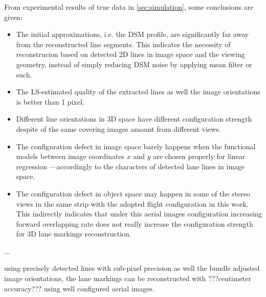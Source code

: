 From experimental results of true data in \cref{sec:simulation}, some conclusions are given:
\begin{itemize}
	\item The initial approximations, i.e. the DSM profile, are significantly far away from the reconstructed line segments. This indicates the necessity of reconstrucion based on detected 2D lines in image space and the viewing geometry, instead of simply reducing DSM noise by applying mean filter or such.
	
	\item The LS-estimated quality of the extracted lines as well the image orientations is better than 1 pixel. %
	
	\item Different line orientations in 3D space have different configuration strength despite of the same covering images amount from different views.
	
	\item The configuration defect in image space %
	barely happens when the functional models between image coordinates $x$ and $y$ are chosen properly for linear regression ---accordingly to the characters of detected lane lines in image space. %
	
	\item  The configuration defect in object space %
	may happen in some of the stereo views in the same strip with the adopted flight configuration in this work.%
	This indirectly indicates that under this aerial images configuration increasing forward overlapping rate does not really increase the configuration strength for 3D lane markings reconstruction.
	
\end{itemize}



...

using precisely detected lines with sub-pixel precision as well the bundle adjusted image orientations, the lane markings can be reconstructed with ???centimeter accuracy??? using well configured aerial images.


